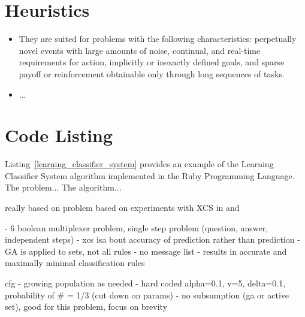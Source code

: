 \documentclass[a4paper, 11pt]{article}
\begin{document}
\section{Heuristics}
\label{sec:heuristics}
\begin{itemize}
	\item They are suited for problems with the following characteristics: perpetually novel events with large amounts of noise, continual, and real-time requirements for action, implicitly or inexactly defined goals, and sparse payoff or reinforcement obtainable only through long sequences of tasks.
	\item ...
	
\end{itemize}

\section{Code Listing}
\label{sec:code}
Listing~\ref{learning_classifier_system} provides an example of the Learning Classifier System algorithm implemented in the Ruby Programming Language. 
The problem...
The algorithm...


really based on \cite{Butz2002a}
problem based on experiments with XCS in \cite{Wilson1995} and \cite{Wilson1998}

- 6 boolean multiplexer problem, single step problem (question, answer, independent steps)
- xcs isa bout accuracy of prediction rather than prediction
- GA is applied to sets, not all rules
- no message list
- results in accurate and maximally minimal classification rules

cfg
- growing population as needed
- hard coded alpha=0.1, v=5, delta=0.1, probability of # = 1/3 (cut down on params)
- no subsumption (ga or active set), good for this problem, focus on brevity
\end{document}
